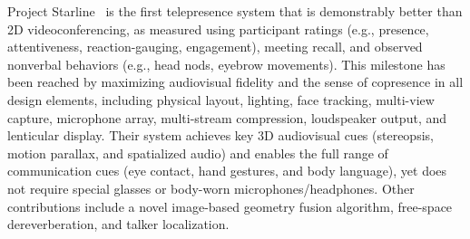 Project Starline~\cite{lawrence_project_2021} is the first telepresence system that is demonstrably better than 2D videoconferencing, as measured using participant ratings (e.g., presence, attentiveness, reaction-gauging, engagement), meeting recall, and observed nonverbal behaviors (e.g., head nods, eyebrow movements). This milestone has been reached by maximizing audiovisual fidelity and the sense of copresence in all design elements, including physical layout, lighting, face tracking, multi-view capture, microphone array, multi-stream compression, loudspeaker output, and lenticular display. Their system achieves key 3D audiovisual cues (stereopsis, motion parallax, and spatialized audio) and enables the full range of communication cues (eye contact, hand gestures, and body language), yet does not require special glasses or body-worn microphones/headphones. Other contributions include a novel image-based geometry fusion algorithm, free-space dereverberation, and talker localization.






